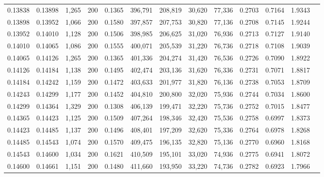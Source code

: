 \begin{tabular}{rrrrrrrrrrrrr}
0.13838 & 0.13898 &  1,265 & 200 &                                     0.1365 & 396,791 & 208,819 &  30,620 &  77,336 & 0.2703 & 0.7164 & 1.9343 \\
0.13898 & 0.13952 &  1,066 & 200 &                                     0.1580 & 397,857 & 207,753 &  30,820 &  77,136 & 0.2708 & 0.7145 & 1.9244 \\
0.13952 & 0.14010 &  1,128 & 200 &                                     0.1506 & 398,985 & 206,625 &  31,020 &  76,936 & 0.2713 & 0.7127 & 1.9140 \\
0.14010 & 0.14065 &  1,086 & 200 &                                     0.1555 & 400,071 & 205,539 &  31,220 &  76,736 & 0.2718 & 0.7108 & 1.9039 \\
0.14065 & 0.14126 &  1,265 & 200 &                                     0.1365 & 401,336 & 204,274 &  31,420 &  76,536 & 0.2726 & 0.7090 & 1.8922 \\
0.14126 & 0.14184 &  1,138 & 200 &                                     0.1495 & 402,474 & 203,136 &  31,620 &  76,336 & 0.2731 & 0.7071 & 1.8817 \\
0.14184 & 0.14242 &  1,159 & 200 &                                     0.1472 & 403,633 & 201,977 &  31,820 &  76,136 & 0.2738 & 0.7053 & 1.8709 \\
0.14243 & 0.14299 &  1,177 & 200 &                                     0.1452 & 404,810 & 200,800 &  32,020 &  75,936 & 0.2744 & 0.7034 & 1.8600 \\
0.14299 & 0.14364 &  1,329 & 200 &                                     0.1308 & 406,139 & 199,471 &  32,220 &  75,736 & 0.2752 & 0.7015 & 1.8477 \\
0.14365 & 0.14423 &  1,125 & 200 &                                     0.1509 & 407,264 & 198,346 &  32,420 &  75,536 & 0.2758 & 0.6997 & 1.8373 \\
0.14423 & 0.14485 &  1,137 & 200 &                                     0.1496 & 408,401 & 197,209 &  32,620 &  75,336 & 0.2764 & 0.6978 & 1.8268 \\
0.14485 & 0.14543 &  1,074 & 200 &                                     0.1570 & 409,475 & 196,135 &  32,820 &  75,136 & 0.2770 & 0.6960 & 1.8168 \\
0.14543 & 0.14600 &  1,034 & 200 &                                     0.1621 & 410,509 & 195,101 &  33,020 &  74,936 & 0.2775 & 0.6941 & 1.8072 \\
0.14600 & 0.14661 &  1,151 & 200 &                                     0.1480 & 411,660 & 193,950 &  33,220 &  74,736 & 0.2782 & 0.6923 & 1.7966 \\

\end{tabular}
